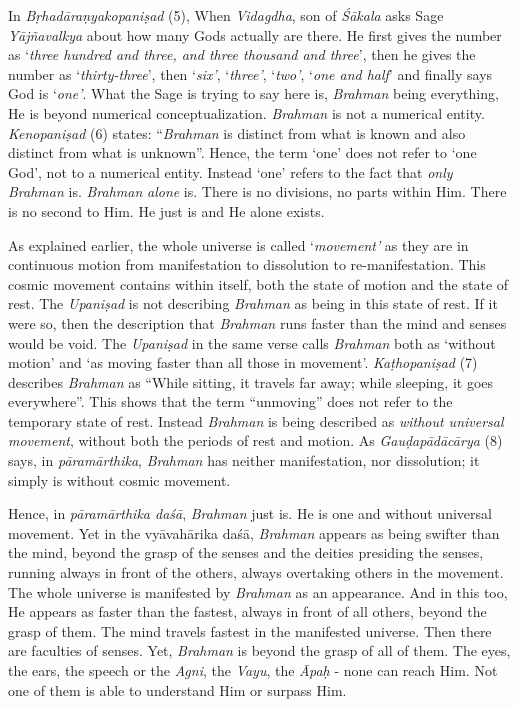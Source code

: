 In \emph{Bṛhadāraṇyakopaniṣad} (5), When \emph{Vidagdha}, son of \emph{Śākala} asks Sage \emph{Yājñavalkya} about how many Gods actually are there. He first gives the number as `\emph{three hundred and three, and three thousand and three}', then he gives the number as `\emph{thirty-three}', then `\emph{six'}, `\emph{three'}, `\emph{two'}, `\emph{one and half}' and finally says God is `\emph{one'}. What the Sage is trying to say here is, \emph{Brahman} being everything, He is beyond numerical conceptualization. \emph{Brahman} is not a numerical entity. \emph{Kenopaniṣad} (6) states: ``\emph{Brahman} is distinct from what is known and also distinct from what is unknown''. Hence, the term `one' does not refer to `one God', not to a numerical entity. Instead `one' refers to the fact that \emph{only} \emph{Brahman} is. \emph{Brahman} \emph{alone} is. There is no divisions, no parts within Him. There is no second to Him. He just is and He alone exists.

As explained earlier, the whole universe is called `\emph{movement'} as they are in continuous motion from manifestation to dissolution to re-manifestation. This cosmic movement contains within itself, both the state of motion and the state of rest. The \emph{Upaniṣad} is not describing \emph{Brahman} as being in this state of rest. If it were so, then the description that \emph{Brahman} runs faster than the mind and senses would be void. The \emph{Upaniṣad} in the same verse calls \emph{Brahman} both as `without motion' and `as moving faster than all those in movement'. \emph{Kaṭhopaniṣad} (7) describes \emph{Brahman} as ``While sitting, it travels far away; while sleeping, it goes everywhere''. This shows that the term ``unmoving'' does not refer to the temporary state of rest. Instead \emph{Brahman} is being described as \emph{without universal movement}, without both the periods of rest and motion. As \emph{Gauḍapādācārya} (8) says, in \emph{pāramārthika}, \emph{Brahman} has neither manifestation, nor dissolution; it simply is without cosmic movement.

Hence, in \emph{pāramārthika daśā}, \emph{Brahman} just is. He is one and without universal movement. Yet in the vyāvahārika daśā, \emph{Brahman} appears as being swifter than the mind, beyond the grasp of the senses and the deities presiding the senses, running always in front of the others, always overtaking others in the movement. The whole universe is manifested by \emph{Brahman} as an appearance. And in this too, He appears as faster than the fastest, always in front of all others, beyond the grasp of them. The mind travels fastest in the manifested universe. Then there are faculties of senses. Yet, \emph{Brahman} is beyond the grasp of all of them. The eyes, the ears, the speech or the \emph{Agni}, the \emph{Vayu}, the \emph{Āpaḥ} - none can reach Him. Not one of them is able to understand Him or surpass Him.

